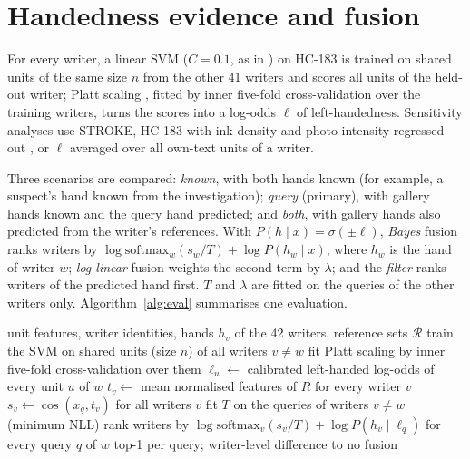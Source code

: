 \documentclass[conference,a4paper]{IEEEtran}
\begin{document}
\section{Handedness evidence and fusion}
\label{sec:methods}
For every writer, a linear SVM ($C=0.1$, as in \cite{anon2026handedness}) on HC-183 is trained on shared units of the same size $n$ from the other 41 writers and scores all units of the held-out writer; Platt scaling \cite{platt1999probabilistic}, fitted by inner five-fold cross-validation over the training writers, turns the scores into a log-odds $\ell$ of left-handedness. Sensitivity analyses use STROKE, HC-183 with ink density and photo intensity regressed out \cite{anon2026handedness}, or $\ell$ averaged over all own-text units of a writer.

Three scenarios are compared: \emph{known}, with both hands known (for example, a suspect's hand known from the investigation); \emph{query} (primary), with gallery hands known and the query hand predicted; and \emph{both}, with gallery hands also predicted from the writer's references. With $P(h\mid x)=\sigma(\pm\ell)$, \emph{Bayes} fusion ranks writers by $\log\mathrm{softmax}_w(s_w/T)+\log P(h_w\mid x)$, where $h_w$ is the hand of writer $w$; \emph{log-linear} fusion weights the second term by $\lambda$; and the \emph{filter} ranks writers of the predicted hand first. $T$ and $\lambda$ are fitted on the queries of the other writers only. Algorithm~\ref{alg:eval} summarises one evaluation.
\begin{algorithm}[t]
\caption{Evaluation of one setting with predicted query handedness}
\label{alg:eval}
\footnotesize
\begin{algorithmic}[1]
\Require unit features, writer identities, hands $h_v$ of the 42 writers, reference sets $\mathcal{R}$
  \State train the SVM on shared units (size $n$) of all writers $v\neq w$
  \State fit Platt scaling by inner five-fold cross-validation over them
  \State $\ell_u\gets$ calibrated left-handed log-odds of every unit $u$ of $w$
\EndFor
{}
  \State $t_v\gets$ mean normalised features of $R$ for every writer $v$
  \State $s_v\gets\cos(x_q,t_v)$ for all writers $v$
\EndFor
{}
  \State fit $T$ on the queries of writers $v\neq w$ (minimum NLL)
  \State rank writers by $\log\mathrm{softmax}_v(s_v/T)+\log P(h_v\mid\ell_q)$ for every query $q$ of $w$
\EndFor
\State \Return top-1 per query; writer-level difference to no fusion
\end{algorithmic}
\end{algorithm}
\end{document}
